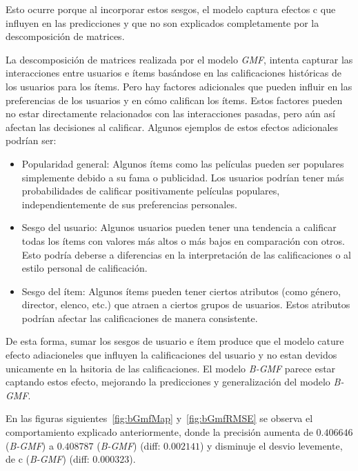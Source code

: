 \documentclass[11pt,a4paper,twoside]{thesis}
\begin{document}
Esto ocurre porque al incorporar estos sesgos, el modelo captura efectos c que
influyen en las predicciones y que no son explicados completamente por la
descomposición de matrices.

La descomposición de matrices realizada por el modelo \textit{GMF}, intenta
capturar las interacciones entre usuarios e ítems basándose en las
calificaciones históricas de los usuarios para los ítems. Pero hay factores
adicionales que pueden influir en las preferencias de los usuarios y en cómo
califican los ítems. Estos factores pueden no estar directamente relacionados
con las interacciones pasadas, pero aún así afectan las decisiones al
calificar. Algunos ejemplos de estos efectos adicionales podrían ser:

\begin{itemize}
	\item Popularidad general: Algunos ítems como las películas pueden ser populares
	      simplemente debido a su fama o publicidad. Los usuarios podrían tener más
	      probabilidades de calificar positivamente películas populares,
	      independientemente de sus preferencias personales.

	\item Sesgo del usuario: Algunos usuarios pueden tener una tendencia a calificar
	      todas los ítems con valores más altos o más bajos en comparación con otros.
	      Esto podría deberse a diferencias en la interpretación de las calificaciones o
	      al estilo personal de calificación.

	\item Sesgo del ítem: Algunos ítems pueden tener ciertos atributos (como género,
	      director, elenco, etc.) que atraen a ciertos grupos de usuarios. Estos
	      atributos podrían afectar las calificaciones de manera consistente.
\end{itemize}

De esta forma, sumar los sesgos de usuario e ítem produce que el modelo cature
efecto adiacioneles que influyen la calificaciones del usuario y no estan
devidos unicamente en la hsitoria de las calificaciones. El modelo
\textit{B-GMF} parece estar captando estos efecto, mejorando la predicciones y
generalización del modelo \textit{B-GMF}.

En las figuras siguientes~\ref{fig:bGmfMap} y~\ref{fig:bGmfRMSE} se observa el
comportamiento explicado anteriormente, donde la precisión aumenta de
$0.406646$ (\textit{B-GMF}) a $0.408787$ (\textit{B-GMF}) (diff: $0.002141$) y
disminuje el desvio levemente, de c (\textit{B-GMF}) (diff: $0.000323$).
\end{document}
